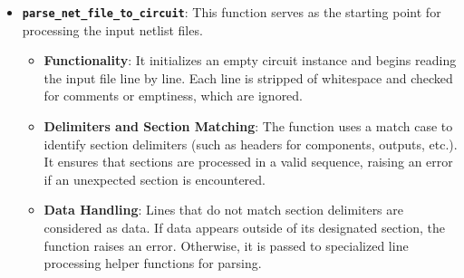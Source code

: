 \documentclass[conference]{IEEEtran}
\begin{document}
\begin{itemize}
      \item {\textbf{\texttt{parse\_net\_file\_to\_circuit}}}: This function serves as the starting point for processing the input netlist files.
            \begin{itemize}
                  \item \textbf{Functionality}: It initializes an empty circuit instance and begins reading the input file line by line.
                        Each line is stripped of whitespace and checked for comments or emptiness, which are ignored.
                  \item \textbf{Delimiters and Section Matching}: The function uses a match case to identify section delimiters
                        (such as headers for components, outputs, etc.). It ensures that sections are processed in a valid sequence,
                        raising an error if an unexpected section is encountered.
                  \item \textbf{Data Handling}: Lines that do not match section delimiters are considered as data. If data appears
                        outside of its designated section, the function raises an error. Otherwise, it is passed to specialized line processing
                        helper functions for parsing.
            \end{itemize}


\end{itemize}
\end{document}
